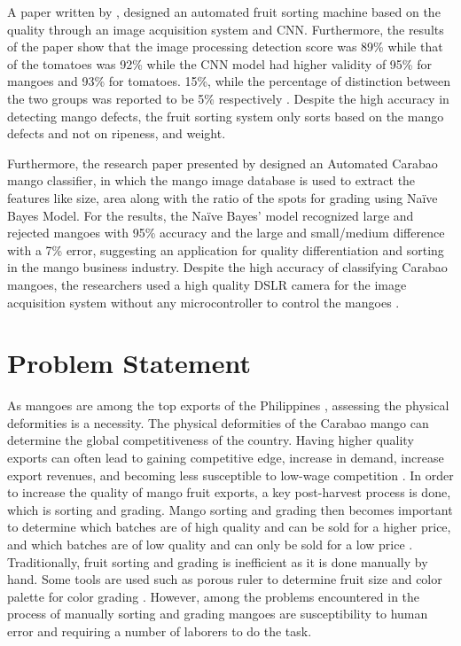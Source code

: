 A paper written by \citet{amna-et-al-machine-2023}, designed an automated fruit sorting machine based on the quality through 
an image acquisition system and CNN. Furthermore, the results of the paper show that the image processing detection 
score was 89\% while that of the tomatoes was 92\% while the CNN model had higher validity of 95\% for mangoes and 93\% 
for tomatoes. 15\%, while the percentage of distinction between the two groups was reported to be 5\% respectively 
\citep{amna-et-al-machine-2023}. Despite the high accuracy in detecting mango defects, the fruit sorting system only sorts based 
on the mango defects and not on ripeness, and weight.

Furthermore, the research paper presented by \citet{guillergan-naive-2024} designed an Automated Carabao mango classifier, 
in which the mango image database is used to extract the features like size, area along with the ratio of the spots for 
grading using Naïve Bayes Model. For the results, the Naïve Bayes’ model recognized large and rejected mangoes with 95\%
 accuracy and the large and small/medium difference with a 7\% error, suggesting an application for quality differentiation 
 and sorting in the mango business industry. Despite the high accuracy of classifying Carabao mangoes, the researchers used a 
 high quality DSLR camera for the image acquisition system without any microcontroller to control the mangoes \citep{guillergan-naive-2024}. 


\section{Problem Statement}
As mangoes are among the top exports of the Philippines \citep{centino-current-nodate}, 
assessing the physical deformities is a necessity. The physical deformities of the 
Carabao mango can determine the global competitiveness of the country. Having higher quality
 exports can often lead to gaining competitive edge, increase in demand, increase export revenues,
  and becoming less susceptible to low-wage competition \citep{dadamo-determinants-2018}. In order to increase the 
  quality of mango fruit exports, a key post-harvest process is done, which is sorting and grading.
   Mango sorting and grading then becomes important to determine which batches are of high quality and
    can be sold for a higher price, and which batches are of low quality and can only be sold for a low price
	 \citep{zhengzhou-first-industry-co-ltd-what-nodate}. Traditionally, fruit sorting and grading is inefficient as it is
	  done manually by hand. Some tools are used such as porous ruler to determine fruit size and color palette 
	  for color grading \citep{zhengzhou-first-industry-co-ltd-what-nodate}. However, among the problems encountered in the 
	  process of manually sorting and grading mangoes are susceptibility to human error and requiring a number of 
	  laborers to do the task. 

